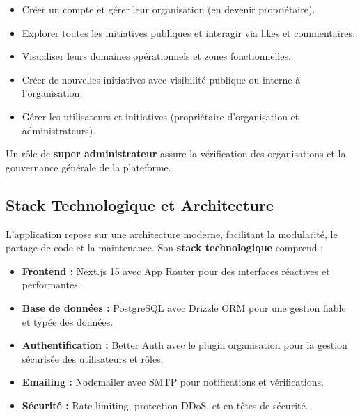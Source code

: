\begin{itemize}
    \item Créer un compte et gérer leur organisation (en devenir propriétaire).
    \item Explorer toutes les initiatives publiques et interagir via likes et commentaires.
    \item Visualiser leurs domaines opérationnels et zones fonctionnelles.
    \item Créer de nouvelles initiatives avec visibilité publique ou interne à l'organisation.
    \item Gérer les utilisateurs et initiatives (propriétaire d'organisation et administrateurs).
\end{itemize}
Un rôle de \textbf{super administrateur} assure la vérification des organisations et la gouvernance générale de la plateforme. \\[2mm]

\subsection{Stack Technologique et Architecture}
L'application repose sur une architecture moderne, facilitant la modularité, le partage de code et la maintenance. Son \textbf{stack technologique} comprend :
\begin{itemize}
    \item \textbf{Frontend :} Next.js 15 avec App Router pour des interfaces réactives et performantes.
    \item \textbf{Base de données :} PostgreSQL avec Drizzle ORM pour une gestion fiable et typée des données.
    \item \textbf{Authentification :} Better Auth avec le plugin organisation pour la gestion sécurisée des utilisateurs et rôles.
    \item \textbf{Emailing :} Nodemailer avec SMTP pour notifications et vérifications.
    \item \textbf{Sécurité :} Rate limiting, protection DDoS, et en-têtes de sécurité.\\
\end{itemize}

